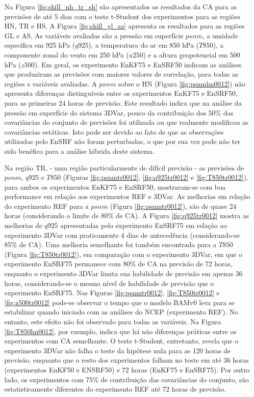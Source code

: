 Na Figura \ref{fig:skill_nh_tr_sh} são apresentados os resultados da CA para as previsões de até 5 dias com o teste t-Student dos experimentos para as regiões HN, TR e HS. A Figura \ref{fig:skill_gl_sa} apresenta os resultados para as regiões GL e AS. As variáveis avaliadas são a pressão em superfície $psnm$, a umidade específica em 925 hPa ($q925$), a temperatura do ar em 850 hPa ($T850$), a componente zonal do vento em 250 hPa ($u250$) e a altura geopotencial em 500 hPa ($z500$). Em geral, os experimento EnKF75 e EnSRF50 indicam as análises que produziram as previsões com maiores valores de correlação, para todas as regiões e variáveis avaliadas. A $psnm$ sobre o HN (Figura \ref{fig:psnmhn0012}) não apresenta diferenças distinguíveis entre os experimentos EnKF75 e EnSRF50, para as primeiras 24 horas de previsão. Este resultado indica que na análise da pressão em superfície do sistema 3DVar, pouco da contribuição dos 50\% das covariâncias do conjunto de previsões foi utilizada ou que realmente modificou as covariâncias estáticas. Isto pode ser devido ao fato de que as observações utilizadas pelo EnSRF não foram perturbadas, o que por sua vez pode não ter sido benéfico para a análise híbrida deste sistema.

Na região TR, - uma região particularmente de difícil previsão - as previsões de $psnm$, $q925$ e $T850$ (Figuras \ref{fig:psnmtr0012}, \ref{fig:q925tr0012} e \ref{fig:T850tr0012}), para ambos os experimentos EnKF75 e EnSRF50, mostraram-se com boa performance em relação aos experimentos REF e 3DVar. As melhorias em relação do experimento REF para a $psnm$ (Figura \ref{fig:psnmtr0012}), são de quase 24 horas (considerando o limite de 80\% de CA). A Figura \ref{fig:q925tr0012} mostra as melhorias de $q925$ apresentadas pelo experimento EnSRF75 em relação ao experimento 3DVar com praticamente 4 dias de antecedência (considerando-se 85\% de CA). Uma melhoria semelhante foi também encontrada para a $T850$ (Figura \ref{fig:T850tr0012}), em comparação com o experimento 3DVar, em que o experimento EnSRF75 permanece com 80\% de CA na previsão de 72 horas, enquanto o experimento 3DVar limita sua habilidade de previsão em apenas 36 horas, considerando-se o mesmo nível de habilidade de previsão que o experimento EnSRF75. Nas Figuras \ref{fig:psnmtr0012}, \ref{fig:T850tr0012} e \ref{fig:z500tr0012} pode-se observar o tempo que o modelo BAMv0 leva para se estabilizar quando iniciado com as análises do NCEP (experimento REF). No entanto, este efeito não foi observado para todas as variáveis. Na Figura \ref{fig:T850hn0012}, por exemplo, indica que há não diferenças práticas entre os experimentos com CA semelhante. O teste t-Student, entretanto, revela que o experimento 3DVar não falha o teste da hipótese nula para as 120 horas de previsão, enquanto que o resto dos experimentos falham no teste em até 36 horas (experimentos EnKF50 e ENSRF50) e 72 horas (EnKF75 e EnSRF75). Por outro lado, os experimentos com 75\% de contribuição das covariâncias do conjunto, são estatisticamente diferentes do experimento REF até 72 horas de previsão.


